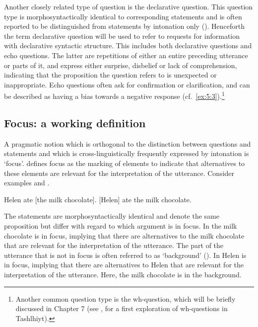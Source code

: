 Another closely related type of question is the declarative question. This question type is morphosyntactically identical to corresponding statements and is often reported to be distinguished from statements by intonation only (\citealt{Haeseryn.etal1997}). Henceforth the term declarative question will be used to refer to requests for information with declarative syntactic structure. This includes both declarative questions and echo questions. The latter are repetitions of either an entire preceding utterance or parts of it, and express either surprise, disbelief or lack of comprehension, indicating that the proposition the question refers to is unexpected or inappropriate. Echo questions often ask for confirmation or clarification, and can be described as having a bias towards a negative response (cf.~\ref{ex:5:3}).\footnote{Another common question type is the wh-question, which will be briefly discussed in Chapter 7 (see \citealt{Bruggeman.etal2017}, for a first exploration of wh-questions in Tashlhiyt).}

\subsection{Focus: a working definition}
A pragmatic notion which is orthogonal to the distinction between questions and statements and which is cross-linguistically frequently expressed by intonation is ‘focus’. \citet{Krifka2008} defines focus as the marking of elements to indicate that alternatives to these elements are relevant for the interpretation of the utterance. Consider examples  and .

\begin{exe}
\ex\label{ex:5:4} Helen ate [the milk chocolate].
\ex\label{ex:5:5} {[Helen]} ate the milk chocolate.
\end{exe}

The statements are morphosyntactically identical and denote the same proposition but differ with regard to which argument is in focus. In  the milk chocolate is in focus, implying that there are alternatives to the milk chocolate that are relevant for the interpretation of the utterance. The part of the utterance that is not in focus is often referred to as ‘background’ (\citealt{Lambrecht1996}). In  Helen is in focus, implying that there are alternatives to Helen that are relevant for the interpretation of the utterance. Here, the milk chocolate is in the background.

